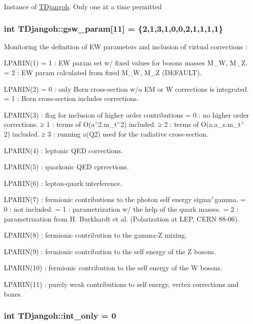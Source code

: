 Instance of \hyperlink{class_t_djangoh}{T\+Djangoh}. Only one at a time permitted \hypertarget{class_t_djangoh_a73c1e424fd8153cd323a25390efb2362}{
\subsubsection[{gsw\+\_\+param}]{\setlength{\rightskip}{0pt plus 5cm}int T\+Djangoh\+::gsw\+\_\+param\mbox{[}11\mbox{]} = \{2,1,3,1,0,0,2,1,1,1,1\}}}\label{class_t_djangoh_a73c1e424fd8153cd323a25390efb2362}
Monitoring the definition of E\+W parameters and inclusion of virtual corrections \+:
\begin{DoxyItemize}
\item L\+P\+A\+R\+I\+N(1) = 1 \+: E\+W param set w/ fixed values for bosons masses M\+\_\+\+W, M\+\_\+\+Z. = 2 \+: E\+W param calculated from fixed M\+\_\+\+W, M\+\_\+\+Z (D\+E\+F\+A\+U\+L\+T).
\item L\+P\+A\+R\+I\+N(2) = 0 \+: only Born cross-\/section w/o E\+M or W corrections is integrated. = 1 \+: Born cross-\/section includes corrections.
\item L\+P\+A\+R\+I\+N(3) \+: flag for inclusion of higher order contributions = 0 \+: no higher order corrections. ≥ 1 \+: terms of O(a$^\wedge$2.m\+\_\+t$^\wedge$2) included. ≥ 2 \+: terms of O(a.\+a\+\_\+s.\+m\+\_\+t$^\wedge$2) included. ≥ 3 \+: running a(\+Q2) used for the radiative cross-\/section.
\item L\+P\+A\+R\+I\+N(4) \+: leptonic Q\+E\+D corrections.
\item L\+P\+A\+R\+I\+N(5) \+: quarkonic Q\+E\+D cprrections.
\item L\+P\+A\+R\+I\+N(6) \+: lepton-\/quark interference.
\item L\+P\+A\+R\+I\+N(7) \+: fermionic contributions to the photon self energy sigma$^\wedge$gamma. = 0 \+: not included. = 1 \+: parametrization w/ the help of the quark masses. = 2 \+: parametrization from H. Burkhardt et al. (Polarization at L\+E\+P, C\+E\+R\+N 88-\/06).
\item L\+P\+A\+R\+I\+N(8) \+: fermionic contribution to the gamma-\/\+Z mixing.
\item L\+P\+A\+R\+I\+N(9) \+: fermionic contribution to the self energy of the Z bosons.
\item L\+P\+A\+R\+I\+N(10) \+: fermionic contribution to the self energy of the W bosons.
\item L\+P\+A\+R\+I\+N(11) \+: purely weak contributions to self energy, vertex corrections and boxes. 
\end{DoxyItemize}\hypertarget{class_t_djangoh_ad3d8b1c563bb610f3a75735e2976f82d}{
\subsubsection[{int\+\_\+only}]{\setlength{\rightskip}{0pt plus 5cm}int T\+Djangoh\+::int\+\_\+only = 0}}\label{class_t_djangoh_ad3d8b1c563bb610f3a75735e2976f82d}
